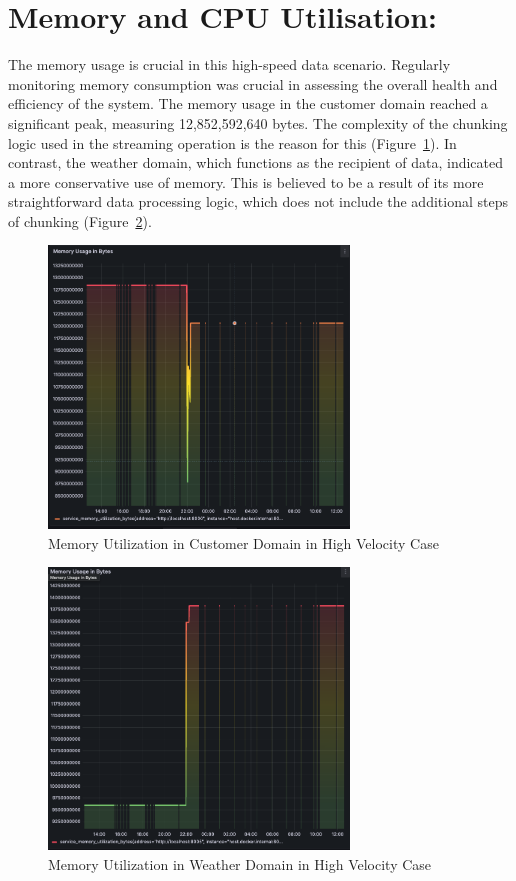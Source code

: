 \documentclass[preprint,12pt]{elsarticle}
\begin{document}
\section{Memory and CPU Utilisation:} The memory usage is crucial in this high-speed data scenario. Regularly monitoring memory consumption was crucial in assessing the overall health and efficiency of the system. The memory usage in the customer domain reached a significant peak, measuring 12,852,592,640 bytes. The complexity of the chunking logic used in the streaming operation is the reason for this (Figure~\ref{memoryUtilizationInCustomerDomainInHighVelocityCase}). In contrast, the weather domain, which functions as the recipient of data, indicated a more conservative use of memory. This is believed to be a result of its more straightforward data processing logic, which does not include the additional steps of chunking (Figure~\ref{memoryUtilizationInWeatherDomainInHighVelocityCase}).

\begin{figure}[h]
  \centering
  \includegraphics[width=8cm]{images/memory-utilization-in-customer-domain-in-streaming-case.png}
  \caption{Memory Utilization in Customer Domain in High Velocity Case}
  \label{memoryUtilizationInCustomerDomainInHighVelocityCase}
\end{figure}

\begin{figure}[h]
  \centering
  \includegraphics[width=8cm]{images/memory-utilization-in-weather-domain-in-streaming-case.png}
  \caption{Memory Utilization in Weather Domain in High Velocity Case}
  \label{memoryUtilizationInWeatherDomainInHighVelocityCase}
\end{figure}
\end{document}
